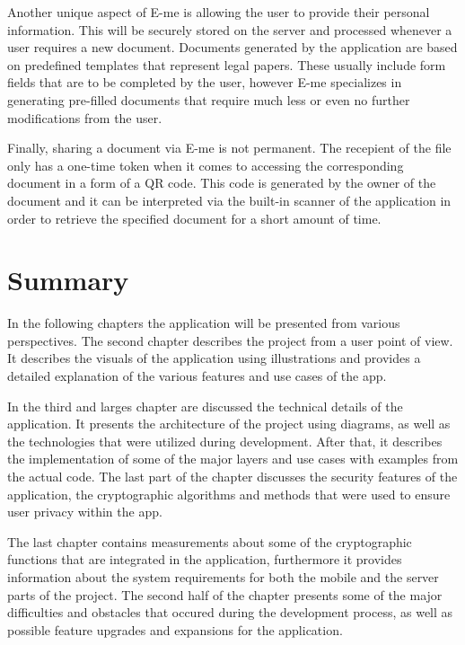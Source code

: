 Another unique aspect of E-me is allowing the user to provide their personal information.
This will be securely stored on the server and processed whenever a user requires a new document.
Documents generated by the application are based on predefined templates that represent legal papers.
These usually include form fields that are to be completed by the user, however E-me specializes in generating pre-filled documents that require 
much less or even no further modifications from the user.

Finally, sharing a document via E-me is not permanent.
The recepient of the file only has a one-time token when it comes to accessing the corresponding document in a form of a QR code.
This code is generated by the owner of the document and it can be interpreted via the built-in scanner of the application in order to 
retrieve the specified document for a short amount of time. 

\section{Summary}\label{sec:INTRO:sum}

In the following chapters the application will be presented from various perspectives.
The second chapter describes the project from a user point of view.
It describes the visuals of the application using illustrations and provides a detailed explanation of the various features and use cases
of the app.

In the third and larges chapter are discussed the technical details of the application.
It presents the architecture of the project using diagrams, as well as the technologies that were utilized during development.
After that, it describes the implementation of some of the major layers and use cases with examples from the actual code.
The last part of the chapter discusses the security features of the application, the cryptographic algorithms and methods that were used
to ensure user privacy within the app.

The last chapter contains measurements about some of the cryptographic functions that are integrated in the application, furthermore
it provides information about the system requirements for both the mobile and the server parts of the project.
The second half of the chapter presents some of the major difficulties and obstacles that occured during the development process, as well as 
possible feature upgrades and expansions for the application.
